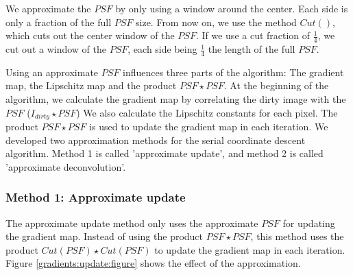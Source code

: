 We approximate the $PSF$ by only using a window around the center. Each side is only a fraction of the full $PSF$ size. From now on, we use the method $Cut()$, which cuts out the center window of the $PSF$. If we use a cut fraction of $\frac{1}{4}$, we cut out a window of the $PSF$, each side being  $\frac{1}{4}$ the length of the full $PSF$.

Using an approximate $PSF$ influences three parts of the algorithm: The gradient map, the Lipschitz map and the product $PSF \star PSF$. At the beginning of the algorithm, we calculate the gradient map by correlating the dirty image with the $PSF$ ($I_{dirty} \star PSF$) We also calculate the Lipschitz constants for each pixel. The product $PSF \star PSF$ is used to update the gradient map in each iteration. We developed two approximation methods for the serial coordinate descent algorithm. Method 1 is called 'approximate update', and method 2 is called 'approximate deconvolution'. 

\subsubsection{Method 1: Approximate update}
The approximate update method only uses the approximate $PSF$ for updating the gradient map. Instead of using the product $PSF \star PSF$, this method uses the product $Cut(PSF) \star Cut(PSF)$ to update the gradient map in each iteration. Figure \ref{gradients:update:figure} shows the effect of the approximation.  


